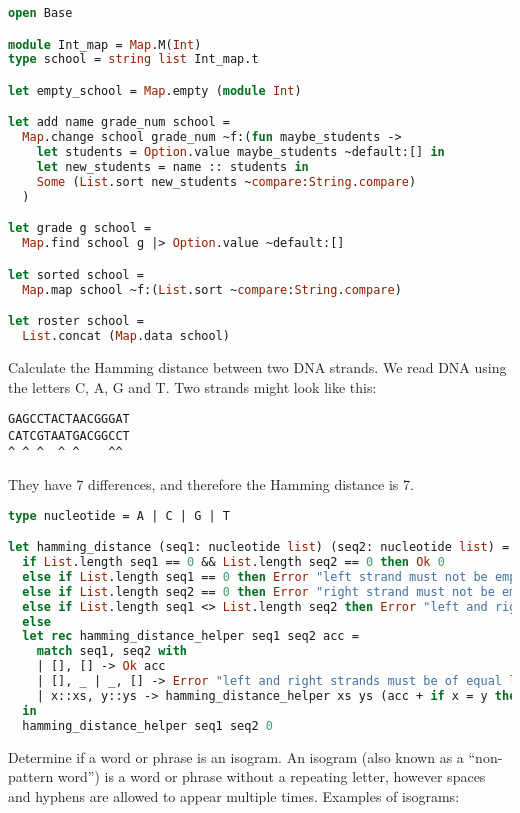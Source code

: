 \begin{lstlisting}[language=OCaml]
open Base

module Int_map = Map.M(Int)
type school = string list Int_map.t

let empty_school = Map.empty (module Int)

let add name grade_num school =
  Map.change school grade_num ~f:(fun maybe_students ->
    let students = Option.value maybe_students ~default:[] in
    let new_students = name :: students in
    Some (List.sort new_students ~compare:String.compare)
  )

let grade g school =
  Map.find school g |> Option.value ~default:[]

let sorted school =
  Map.map school ~f:(List.sort ~compare:String.compare)

let roster school =
  List.concat (Map.data school)
\end{lstlisting}

\problem[Hamming]
Calculate the Hamming distance between two DNA strands.
We read DNA using the letters C, A, G and T.
Two strands might look like this:
\begin{verbatim}
GAGCCTACTAACGGGAT
CATCGTAATGACGGCCT
^ ^ ^  ^ ^    ^^
\end{verbatim}
They have 7 differences, and therefore the Hamming distance is 7.

\begin{lstlisting}[language=OCaml]
type nucleotide = A | C | G | T

let hamming_distance (seq1: nucleotide list) (seq2: nucleotide list) =
  if List.length seq1 == 0 && List.length seq2 == 0 then Ok 0
  else if List.length seq1 == 0 then Error "left strand must not be empty"
  else if List.length seq2 == 0 then Error "right strand must not be empty"
  else if List.length seq1 <> List.length seq2 then Error "left and right strands must be of equal length"
  else
  let rec hamming_distance_helper seq1 seq2 acc = 
    match seq1, seq2 with
    | [], [] -> Ok acc
    | [], _ | _, [] -> Error "left and right strands must be of equal length"
    | x::xs, y::ys -> hamming_distance_helper xs ys (acc + if x = y then 0 else 1)
  in
  hamming_distance_helper seq1 seq2 0
\end{lstlisting}

\problem[Isogram]
Determine if a word or phrase is an isogram.
An isogram (also known as a ``non-pattern word'') is a word or phrase without a repeating letter, however spaces and hyphens are allowed to appear multiple times.
Examples of isograms:

